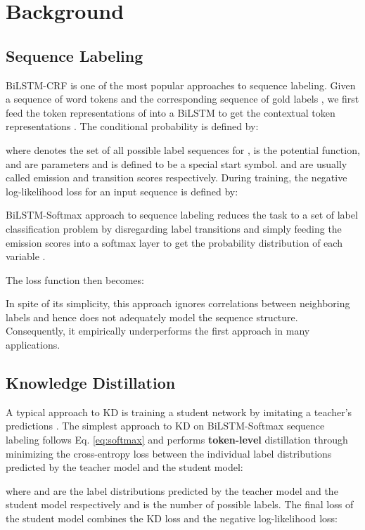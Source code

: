 \documentclass[11pt,a4paper]{article}
\begin{document}
\section{Background}
\subsection{Sequence Labeling}
\label{sec:seq_lab}
BiLSTM-CRF \cite{lample-etal-2016-neural,ma-hovy-2016-end} is one of the most popular approaches to sequence labeling. Given a sequence of  word tokens  and the corresponding sequence of gold labels , we first feed the token representations of  into a BiLSTM to get the contextual token representations .
The conditional probability  is defined by:


where  denotes the set of all possible label sequences for ,
 is the potential function,  and  are parameters and  is defined to be a special start symbol.  and  are usually called emission and transition scores respectively. During training, the negative log-likelihood loss for an input sequence is defined by:


BiLSTM-Softmax approach to sequence labeling reduces the task to a set of label classification problem by disregarding label transitions and simply feeding the emission scores  into a softmax layer to get the probability distribution of each variable .

The loss function then becomes:

In spite of its simplicity, this approach ignores correlations between neighboring labels and hence does not adequately model the sequence structure. Consequently, it empirically underperforms the first approach in many applications. 

\subsection{Knowledge Distillation}
A typical approach to KD is training a student network by imitating a teacher's predictions \cite{44873}. The simplest approach to KD on BiLSTM-Softmax sequence labeling follows Eq. \ref{eq:softmax} and performs \textbf{token-level} distillation through minimizing the cross-entropy loss between the individual label distributions predicted by the teacher model and the student model:

where  and  are the label distributions predicted by the teacher model and the student model respectively and  is the number of possible labels. The final loss of the student model combines the KD loss and the negative log-likelihood loss:
\end{document}
